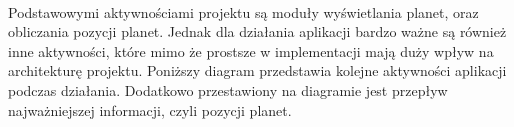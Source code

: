 \paragraph{}

Podstawowymi aktywnościami projektu są moduły wyświetlania planet, oraz obliczania pozycji planet. Jednak dla działania aplikacji bardzo ważne są również inne aktywności, które mimo że prostsze w implementacji mają duży wpływ na architekturę projektu. Poniższy diagram przedstawia kolejne aktywności aplikacji podczas działania. Dodatkowo przestawiony na diagramie jest przepływ najważniejszej informacji, czyli pozycji planet.

\paragraph{}

